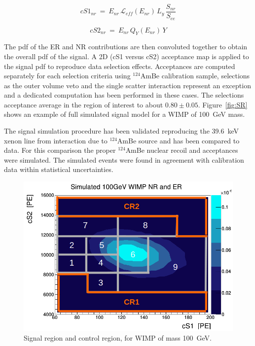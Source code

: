 \begin{equation}
cS1_{nr} ~=~ E_{nr} \, \mathcal{L}_{eff}(E_{nr}) \, L_{y} \, \frac{S_{nr}}{S_{ee}}
\label{f:cs1}
\end{equation}

\begin{equation}
cS2_{nr}  ~ = ~ E_{nr} \, Q_{Y}(E_{nr}) \, Y
\label{f:cs2}
\end{equation}

The pdf of the ER and NR contributions are then convoluted together to obtain the overall pdf of the signal.
A 2D (cS1 versus cS2) acceptance map is applied to the signal pdf to reproduce data selection effects. Acceptances are computed separately for each selection 
criteria using $^{124}$AmBe calibration sample, selections as the outer volume veto and the single scatter interaction represent an exception  and 
a dedicated computation has been performed in these cases. The selections acceptance average in the region of interest to about $0.80 \pm 0.05$. 
Figure~\ref{fig:SR} shows an example of full simulated signal model for a WIMP of 100~GeV mass. 

The signal simulation procedure has been validated reproducing the 39.6~keV xenon line from interaction due to
$^{124}$AmBe source and has been compared to data. For this comparison the proper  $^{124}$AmBe nuclear recoil and acceptances
were simulated. The simulated events were found in agreement  with calibration data within statistical uncertainties.

\begin{figure}[t!]
  \includegraphics[width=\linewidth]{images/wimp_in_sr.png}
  \caption{Signal region and control region, for WIMP of mass 100~GeV.}
  \label{fig:SR2}
\end{figure}


